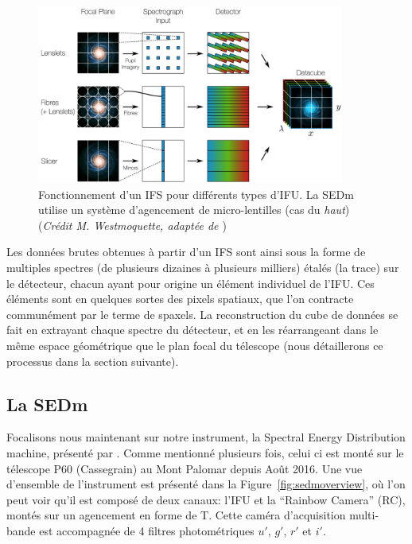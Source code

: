 \documentclass[../main/main.tex]{subfiles}
\begin{document}
\begin{figure}[h]
  \centering
  \includegraphics[width=0.9\textwidth]{../figures/03_sedm/ifsgeneral.png}
  \caption[Fonctionnement d'un IFS]{Fonctionnement d'un IFS pour
    différents types d'IFU. La SEDm utilise un système d'agencement de micro-lentilles (cas
    du \textit{haut})
    (\textit{Crédit M. Westmoquette, adaptée de \citet{allingtonIFS}})}
  \label{fig:ifsgeneral}
\end{figure}

Les données brutes obtenues à partir d'un IFS sont ainsi sous la forme
de multiples spectres (de plusieurs dizaines à plusieurs milliers)
étalés (la trace) sur le détecteur, chacun ayant pour origine un élément individuel
de l'IFU. Ces éléments sont en quelques sortes des pixels spatiaux, que
l'on contracte communément par le terme de spaxels. La reconstruction du
cube de données se fait en extrayant chaque spectre du détecteur, et en
les réarrangeant dans le même espace géométrique que le plan focal du
télescope (nous détaillerons ce processus dans la section suivante).

\subsection{La SEDm}\label{ssec:sedm}

Focalisons nous maintenant sur notre instrument, la Spectral Energy
Distribution machine, présenté par \citet{SEDM18}. Comme mentionné plusieurs fois, celui ci est monté
sur le télescope P60 (Cassegrain) au Mont Palomar depuis Août 2016. Une vue
d'ensemble de l'instrument est présenté dans la
Figure~\ref{fig:sedmoverview}, où l'on peut voir qu'il est composé de
deux canaux: l'IFU et la ``Rainbow Camera'' (RC), montés sur un
agencement en forme de T. Cette caméra d'acquisition multi-bande est
accompagnée de 4 filtres photométriques $u'$, $g'$, $r'$ et $i'$.
\end{document}
